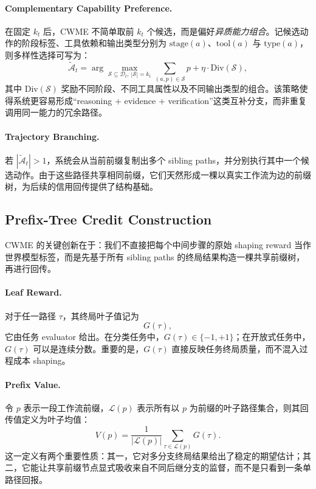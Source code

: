 \paragraph{Complementary Capability Preference.}
在固定 $k_t$ 后，CWME 不简单取前 $k_t$ 个候选，而是偏好\emph{异质能力组合}。记候选动作的阶段标签、工具依赖和输出类型分别为
$\text{stage}(a)$、$\text{tool}(a)$ 与 $\text{type}(a)$，则多样性选择可写为：
\begin{equation}
    \widetilde{\mathcal{A}}_t
    =
    \arg\max_{\mathcal{S} \subseteq \mathcal{D}_t,\ |\mathcal{S}| = k_t}
    \sum_{(a,p)\in \mathcal{S}} p
    +
    \eta \cdot \mathrm{Div}(\mathcal{S}),
\end{equation}
其中 $\mathrm{Div}(\mathcal{S})$ 奖励不同阶段、不同工具属性以及不同输出类型的组合。该策略使得系统更容易形成“reasoning + evidence + verification”这类互补分支，而非重复调用同一能力的冗余路径。

\paragraph{Trajectory Branching.}
若 $|\widetilde{\mathcal{A}}_t| > 1$，系统会从当前前缀复制出多个 sibling paths，并分别执行其中一个候选动作。由于这些路径共享相同前缀，它们天然形成一棵以真实工作流为边的前缀树，为后续的信用回传提供了结构基础。

\subsection{Prefix-Tree Credit Construction}

CWME 的关键创新在于：我们不直接把每个中间步骤的原始 shaping reward 当作世界模型标签，而是先基于所有 sibling paths 的终局结果构造一棵共享前缀树，再进行回传。

\paragraph{Leaf Reward.}
对于任一路径 $\tau$，其终局叶子值记为
\begin{equation}
    G(\tau),
\end{equation}
它由任务 evaluator 给出。在分类任务中，$G(\tau)\in\{-1,+1\}$；在开放式任务中，$G(\tau)$ 可以是连续分数。重要的是，$G(\tau)$ 直接反映任务终局质量，而不混入过程成本 shaping。

\paragraph{Prefix Value.}
令 $p$ 表示一段工作流前缀，$\mathcal{L}(p)$ 表示所有以 $p$ 为前缀的叶子路径集合，则其回传值定义为叶子均值：
\begin{equation}
    V(p) = \frac{1}{|\mathcal{L}(p)|}\sum_{\tau \in \mathcal{L}(p)} G(\tau).
    \label{eq:prefix_value}
\end{equation}
这一定义有两个重要性质：其一，它对多分支终局结果给出了稳定的期望估计；其二，它能让共享前缀节点显式吸收来自不同后继分支的监督，而不是只看到一条单路径回报。

